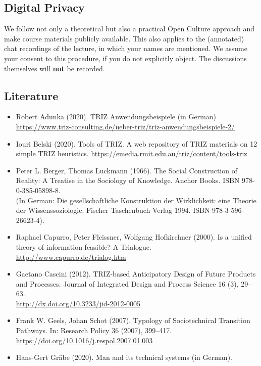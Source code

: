 \documentclass[11pt,a4paper]{article}
\begin{document}
\subsection{Digital Privacy}

We follow not only a theoretical but also a practical Open Culture approach
and make course materials publicly available.  This also applies to the
(annotated) chat recordings of the lecture, in which your names are mentioned.
We assume your consent to this procedure, if you do not explicitly object.
The discussions themselves will \textbf{not} be recorded.

\subsection{Literature}

\begin{itemize}
\item Robert Adunka (2020). TRIZ Anwendungsbeispiele (in German)\\
  \url{https://www.triz-consulting.de/ueber-triz/triz-anwendungsbeispiele-2/} 
\item Iouri Belski (2020). Tools of TRIZ. A web repository of TRIZ materials
  on 12 simple TRIZ heuristics.
  \url{https://emedia.rmit.edu.au/triz/content/tools-triz}
\item Peter L. Berger, Thomas Luckmann (1966). The Social Construction of
  Reality: A Treatise in the Sociology of Knowledge. Anchor Books. ISBN
  978-0-385-05898-8. \\ (In German: Die gesellschaftliche Konstruktion der
  Wirklichkeit: eine Theorie der Wissenssoziologie. Fischer Taschenbuch Verlag
  1994. ISBN 978-3-596-26623-4).
\item Raphael Capurro, Peter Fleissner, Wolfgang Hofkirchner (2000). Is a
  unified theory of information feasible? A Trialogue.
  \url{http://www.capurro.de/trialog.htm}
\item Gaetano Cascini (2012). TRIZ-based Anticipatory Design of Future
  Products and Processes. Journal of Integrated Design and Process Science 16
  (3), 29--63.\\  \url{http://dx.doi.org/10.3233/jid-2012-0005}
\item Frank W. Geels, Johan Schot (2007). Typology of Sociotechnical Transition
  Pathways. In: Research Policy 36 (2007), 399–417.\\
  \url{https://doi.org/10.1016/j.respol.2007.01.003} 
\item Hans-Gert Gräbe (2020). Man and its technical systems (in German).

\end{itemize}
\end{document}
